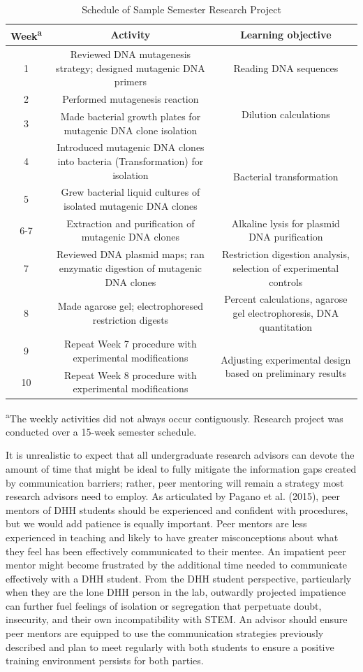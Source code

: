 \documentclass[11.5pt]{sig-alternate} %
\begin{document}
\begin{large}
\begin{table}[th]
\caption{Schedule of Sample Semester Research Project}
\begin{tabular}{ccc}
\hline
\textbf{Week\textsuperscript{a}} & Activity & Learning objective \\ \hline
1 & Reviewed DNA mutagenesis strategy; designed mutagenic DNA primers & Reading DNA sequences \\
2 & Performed mutagenesis reaction & \multirow{2}{=}{Dilution calculations} \\
3 & Made bacterial growth plates for mutagenic DNA clone isolation & \\
4 & Introduced mutagenic DNA clones into bacteria (Transformation) for isolation & \multirow{2}{=}{Bacterial transformation} \\
5 & Grew bacterial liquid cultures of isolated mutagenic DNA clones & \\
6-7 & Extraction and purification of mutagenic DNA clones & Alkaline lysis for plasmid DNA purification \\
7 & Reviewed DNA plasmid maps; ran enzymatic digestion of mutagenic DNA clones & Restriction digestion analysis, selection of experimental controls \\
8 & Made agarose gel; electrophoresed restriction digests & Percent calculations, agarose gel electrophoresis, DNA quantitation \\
9 & Repeat Week 7 procedure with experimental modifications & \multirow{2}{=}{Adjusting experimental design based on preliminary results} \\
10 & Repeat Week 8 procedure with experimental modifications & \\ \hline
\end{tabular}
\textsuperscript{a}The weekly activities did not always occur contiguously. Research project was conducted over a 15-week semester schedule.
\end{table}

It is unrealistic to expect that all undergraduate research advisors can devote the amount of time that might be ideal to fully mitigate the information gaps created by communication barriers; rather, peer mentoring will remain a strategy most research advisors need to employ. As articulated by Pagano et al. (2015), peer mentors of DHH students should be experienced and confident with procedures, but we would add patience is equally important. Peer mentors are less experienced in teaching and likely to have greater misconceptions about what they feel has been effectively communicated to their mentee. An impatient peer mentor might become frustrated by the additional time needed to communicate effectively with a DHH student. From the DHH student perspective, particularly when they are the lone DHH person in the lab, outwardly projected impatience can further fuel feelings of isolation or segregation that perpetuate doubt, insecurity, and their own incompatibility with STEM. An advisor should ensure peer mentors are equipped to use the communication strategies previously described and plan to meet regularly with both students to ensure a positive training environment persists for both parties. 


\end{large}
\end{document}
